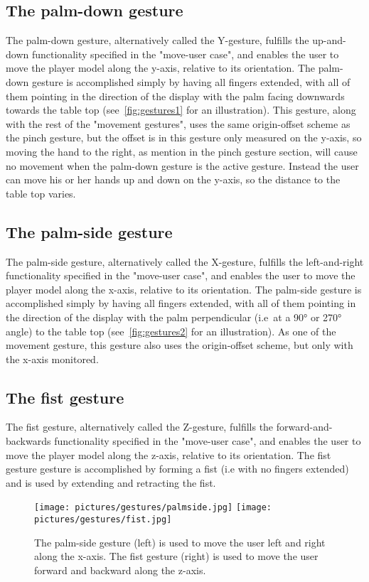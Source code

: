 \subsection{The palm-down gesture}
The palm-down gesture, alternatively called the Y-gesture, fulfills the up-and-down functionality specified in the "move-user case", and enables the user to 
move the player model along the y-axis, relative to its orientation. The palm-down gesture is accomplished simply by having all fingers extended, with all of them pointing in
the direction of the display with the palm facing downwards towards the table top (see~\vref{fig:gestures1} for an illustration). This gesture, along with the rest of the 
"movement gestures", uses the same origin-offset scheme as the pinch gesture, but the offset is in this gesture only measured on the y-axis, so moving the hand to the 
right, as mention in the pinch gesture section, will cause no movement when the palm-down gesture is the active gesture. 
Instead the user can move his or her hands up and down on the y-axis, so the distance to the table top varies.  

\subsection{The palm-side gesture}
The palm-side gesture, alternatively called the X-gesture, fulfills the left-and-right functionality specified in the "move-user case", and enables the user to 
move the player model along the x-axis, relative to its orientation. The palm-side gesture is accomplished simply by having all fingers extended, with all of them pointing in
the direction of the display with the palm perpendicular (i.e~at a 90° or 270° angle) to the table top (see~\vref{fig:gestures2} for an illustration). 
As one of the movement gesture, this gesture also uses the origin-offset scheme, but only with the x-axis monitored.

\subsection{The fist gesture}
The fist gesture, alternatively called the Z-gesture, fulfills the forward-and-backwards functionality specified in the "move-user case", and enables the user to 
move the player model along the z-axis, relative to its orientation. The fist gesture gesture is accomplished by forming a fist (i.e with no fingers extended)
and is used by extending and retracting the fist. 

\begin{figure}%
	\texttt{[image: pictures/gestures/palmside.jpg]}
    \texttt{[image: pictures/gestures/fist.jpg]}
	\caption[The palm-side and fist gestures]{The palm-side gesture (left) is used to move the user left and right along the x-axis. 
             The fist gesture (right) is used to move the user forward and backward along the z-axis.}
	\label{fig:gestures2}
\end{figure} 

